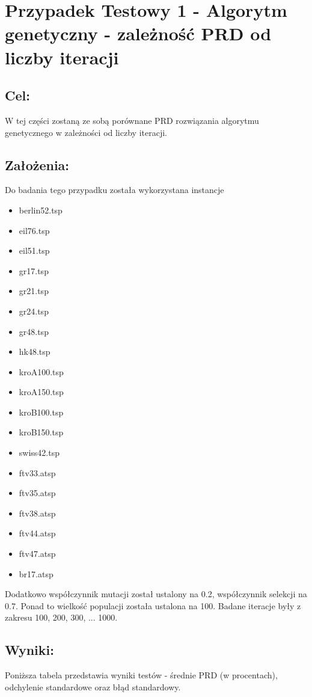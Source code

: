 \section{Przypadek Testowy 1 - Algorytm genetyczny - zależność PRD od liczby iteracji}
  \subsection{Cel:}
    W tej części zostaną ze sobą porównane PRD rozwiązania algorytmu genetycznego w zależności od liczby iteracji.
    \subsection{Założenia:}
    Do badania tego przypadku została wykorzystana instancje 
    \begin{itemize}
      \item berlin52.tsp
      \item eil76.tsp
      \item eil51.tsp
      \item gr17.tsp
      \item gr21.tsp
      \item gr24.tsp
      \item gr48.tsp
      \item hk48.tsp
      \item kroA100.tsp
      \item kroA150.tsp
      \item kroB100.tsp
      \item kroB150.tsp
      \item swiss42.tsp
      \item ftv33.atsp
      \item ftv35.atsp
      \item ftv38.atsp
      \item ftv44.atsp
      \item ftv47.atsp
      \item br17.atsp
    \end{itemize}
    Dodatkowo współczynnik mutacji został ustalony na 0.2, współczynnik selekcji na 0.7. Ponad to wielkość populacji została ustalona na 100. Badane iteracje były z zakresu {100, 200, 300, ... 1000}.
  \subsection{Wyniki: }
  Poniższa tabela przedstawia wyniki testów - średnie PRD (w procentach), odchylenie standardowe oraz błąd standardowy. 
  
